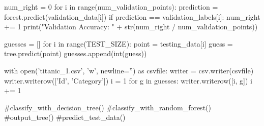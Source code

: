 \documentclass{article}
\begin{document}
\begin{python}
    num_right = 0
    for i in range(num_validation_points):
        prediction = forest.predict(validation_data[i])
        if prediction == validation_labels[i]:
            num_right += 1
    print("Validation Accuracy: " + str(num_right / num_validation_points))

    guesses = []
    for i in range(TEST_SIZE):
        point = testing_data[i]
        guess = tree.predict(point)
        guesses.append(int(guess))

    with open('titanic_1.csv', 'w', newline='') as csvfile:
        writer = csv.writer(csvfile)
        writer.writerow(['Id', 'Category'])
        i = 1
        for g in guesses:
            writer.writerow([i, g])
            i += 1

#classify_with_decision_tree()
#classify_with_random_forest()
#output_tree()
#predict_test_data()
\end{python}

\newpage
\end{document}
